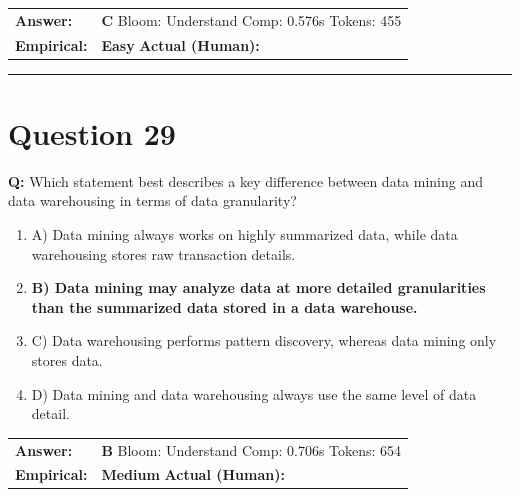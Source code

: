 \documentclass[9pt]{article}
\begin{document}
\begin{tabular}{@{}l p{10.5cm}@{}}
\textbf{Answer:} & \textbf{C} \hspace{1em} Bloom: Understand \hspace{1em} Comp: 0.576s \hspace{1em} Tokens: 455 \\
\textbf{Empirical:} & \textbf{Easy} \hspace{1em} \textbf{Actual (Human):} \underline{\hspace{5cm}}
\end{tabular}

\vspace{0.2cm}
\rule{\textwidth}{0.4pt}
\vspace{0.2cm}


\section*{Question 29}

\textbf{Q:} Which statement best describes a key difference between data mining and data warehousing in terms of data granularity?

\begin{enumerate}[label=\textbf{\alph{*})}, nosep]
    \item A) Data mining always works on highly summarized data, while data warehousing stores raw transaction details.
    \item \textbf{B) Data mining may analyze data at more detailed granularities than the summarized data stored in a data warehouse.} %
    \item C) Data warehousing performs pattern discovery, whereas data mining only stores data.
    \item D) Data mining and data warehousing always use the same level of data detail.

\end{enumerate}

\begin{tabular}{@{}l p{10.5cm}@{}}
\textbf{Answer:} & \textbf{B} \hspace{1em} Bloom: Understand \hspace{1em} Comp: 0.706s \hspace{1em} Tokens: 654 \\
\textbf{Empirical:} & \textbf{Medium} \hspace{1em} \textbf{Actual (Human):} \underline{\hspace{5cm}}
\end{tabular}
\end{document}
